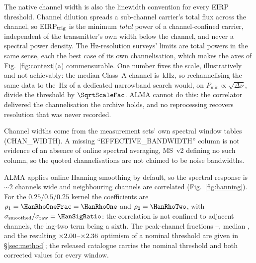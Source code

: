 The native channel width is also the linewidth convention for every EIRP
threshold. Channel dilution spreads a sub-channel carrier's total flux
across the channel, so EIRP$_{\rm trig}$ is the minimum \emph{total} power
of a channel-confined carrier, independent of the transmitter's own width
below the channel, and never a spectral power density. The Hz-resolution
surveys' limits are total powers in the same sense, each the best case of
its own channelisation, which makes the axes of Fig.~\ref{fig:context}(a)
commensurable. One number fixes the scale, illustratively and not
achievably: the median Class~A channel is \SqrtScaleChanKHz\,kHz, so
rechannelising the same data to the \SETIChanHz\,Hz of a dedicated
narrowband search would, on $P_{\min}\propto\sqrt{\Delta\nu}$, divide the
threshold by $\SqrtScaleFac$. ALMA cannot do this: the correlator delivered the
channelisation the archive holds, and no reprocessing recovers resolution
that was never recorded.

Channel widths come from the measurement sets' own spectral window tables
(CHAN\_WIDTH). A missing ``EFFECTIVE\_BANDWIDTH'' column is not evidence of
an absence of online spectral averaging, MS~v2 defining no such column, so
the quoted channelisations are not claimed to be noise bandwidths.

ALMA applies online Hanning smoothing by default, so the spectral response
is ${\sim}2$ channels wide and neighbouring channels are correlated
(Fig.~\ref{fig:hanning}). For the $0.25/0.5/0.25$ kernel the coefficients
are $\rho_1=\HanRhoOneFrac=\HanRhoOne$ and $\rho_2=\HanRhoTwo$, with
$\sigma_{\rm smoothed}/\sigma_{\rm raw}=\HanSigRatio$: the correlation is
not confined to adjacent channels, the lag-two term being a sixth. The
peak-channel fractions \HanWorst--\HanBest, median \HanMed, and the
resulting $\times2.00$--$\times2.36$ optimism of a nominal
threshold are given in \S\ref{sec:method}; the released catalogue carries the
nominal threshold and both corrected values for every window.

